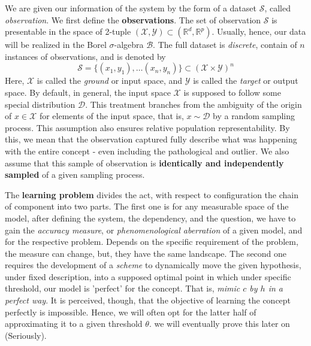 We are given our information of the system by the form of a dataset $\mathcal{S}$, called \textit{observation}. We first define the \textbf{observations}. The set of observation $\mathcal{S}$ is presentable in the space of 2-tuple $(\mathcal{X},\mathcal{Y})\subset(\mathbb{R}^{d},\mathbb{R}^{p})$. Usually, hence, our data will be realized in the Borel $\sigma$-algebra $\mathcal{B}$. The full dataset is \textit{discrete}, contain of $n$ instances of observations, and is denoted by \begin{equation}
    \mathcal{S} = \{ (x_1,y_1),\dots(x_n,y_n) \} \subset (\mathcal{X}\times \mathcal{Y})^n 
\end{equation}
Here, $\mathcal{X}$ is called the \textit{ground} or input space, and $\mathcal{Y}$ is called the \textit{target} or output space. By default, in general, the input space $\mathcal{X}$ is supposed to follow some special distribution $\mathcal{D}$. This treatment branches from the ambiguity of the origin of $x\in\mathcal{X}$ for elements of the input space, that is, $x\sim \mathcal{D}$ by a random sampling process. This assumption also ensures relative population representability. By this, we mean that the observation captured fully describe what was happening with the entire concept - even including the pathological and outlier. We also assume that this sample of observation is \textbf{identically and independently sampled} of a given sampling process. 

The \textbf{learning problem} divides the act, with respect to configuration the chain of component into two parts. The first one is for any measurable space of the model, after defining the system, the dependency, and the question, we have to gain the \textit{accuracy measure}, or \textit{phenomenological aberration} of a given model, and for the respective problem. Depends on the specific requirement of the problem, the measure can change, but, they have the same landscape. The second one requires the development of a \textit{scheme} to dynamically move the given hypothesis, under fixed description, into a supposed optimal point in which under specific threshold, our model is 'perfect' for the concept. That is, \textit{mimic $c$ by $h$ in a perfect way}. It is perceived, though, that the objective of learning the concept perfectly is impossible. Hence, we will often opt for the latter half of approximating it to a given threshold $\theta$. we will eventually prove this later on (Seriously). 

